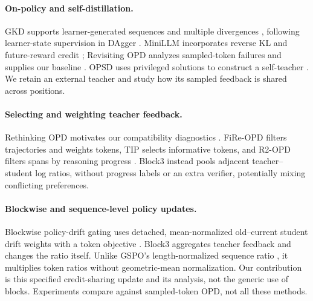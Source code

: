 \paragraph{On-policy and self-distillation.}
GKD supports learner-generated sequences and multiple divergences \citep{gkd}, following learner-state supervision in DAgger \citep{dagger}. MiniLLM incorporates reverse KL and future-reward credit \citep{minillm}; Revisiting OPD analyzes sampled-token failures and supplies our baseline \citep{revisiting}. OPSD uses privileged solutions to construct a self-teacher \citep{opsd}. We retain an external teacher and study how its sampled feedback is shared across positions.

\paragraph{Selecting and weighting teacher feedback.}
Rethinking OPD motivates our compatibility diagnostics \citep{rethinking}. FiRe-OPD filters trajectories and weights tokens, TIP selects informative tokens, and R2-OPD filters spans by reasoning progress \citep{fireopd,tip,r2opd}. Block3 instead pools adjacent teacher--student log ratios, without progress labels or an extra verifier, potentially mixing conflicting preferences.

\paragraph{Blockwise and sequence-level policy updates.}
Blockwise policy-drift gating uses detached, mean-normalized old--current student drift weights with a token objective \citep{bpdg}. Block3 aggregates teacher feedback and changes the ratio itself. Unlike GSPO's length-normalized sequence ratio \citep{gspo}, it multiplies token ratios without geometric-mean normalization. Our contribution is this specified credit-sharing update and its analysis, not the generic use of blocks. Experiments compare against sampled-token OPD, not all these methods.
